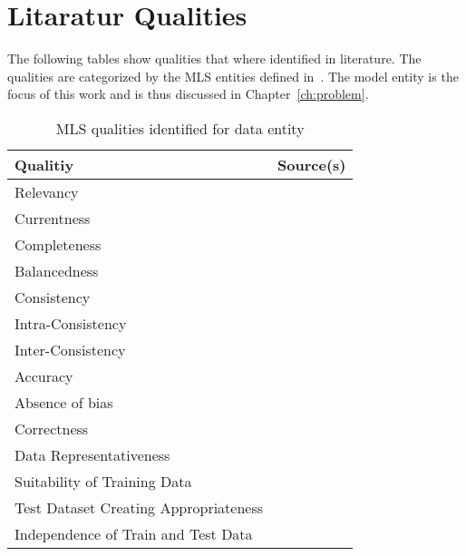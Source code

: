 \clearpage
%
%



\appendix
\chapter{Litaratur Qualities}

The following tables show qualities that where identified in literature.
The qualities are categorized by the \ac{MLS} entities defined in~\cite{siebert_construction_2021}.
The model entity is the focus of this work and is thus discussed in Chapter~\ref{ch:problem}.
\begin{table}[h]\label{tb:LiteratureQualitiesData}
    \centering\footnotesize
    \begin{tabular}{p{} p{}}
        \textbf{Qualitiy} & \textbf{Source(s)} \\
        \toprule
        Relevancy &~\cite{ashmore_assuring_2021} \\
        Currentness &~\cite{siebert_construction_2021} \\
        Completeness &~\cite{ashmore_assuring_2021, vogelsang_requirements_2019,
                            siebert_construction_2021} \\
        Balancedness &~\cite{ashmore_assuring_2021,siebert_construction_2021} \\
        Consistency &~\cite{vogelsang_requirements_2019} \\
        Intra-Consistency &~\cite{siebert_construction_2021} \\
        Inter-Consistency &~\cite{siebert_construction_2021} \\
        Accuracy &~\cite{ashmore_assuring_2021} \\
        Absence of bias &~\cite{siebert_construction_2021} \\
        Correctness &~\cite{vogelsang_requirements_2019} \\
        Data Representativeness &~\cite{nakamichi_requirements-driven_2020, siebert_construction_2021} \\
        Suitability of Training Data &~\cite{nakamichi_requirements-driven_2020} \\
        Test Dataset Creating Appropriateness &~\cite{nakamichi_requirements-driven_2020} \\
        Independence of Train and Test Data &~\cite{nakamichi_requirements-driven_2020,
                                                    siebert_construction_2021} \\
    \end{tabular}
    \caption{MLS qualities identified for data entity}
\end{table}

